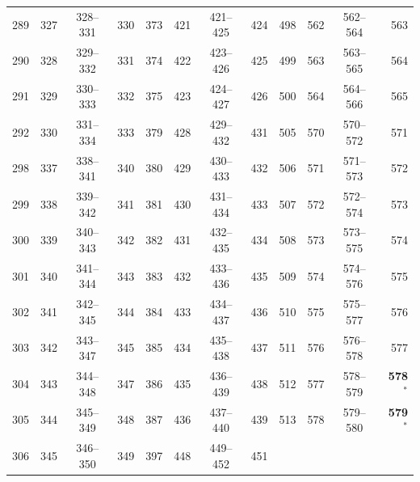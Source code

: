 \begin{longtable}{rrcr|rrcr|rrcr}
289 & 327 & 328--331 & 330 & 373 & 421 & 421--425 & 424 & 498 & 562 & 562--564 & 563 \\
290 & 328 & 329--332 & 331 & 374 & 422 & 423--426 & 425 & 499 & 563 & 563--565 & 564 \\
291 & 329 & 330--333 & 332 & 375 & 423 & 424--427 & 426 & 500 & 564 & 564--566 & 565 \\
292 & 330 & 331--334 & 333 & 379 & 428 & 429--432 & 431 & 505 & 570 & 570--572 & 571 \\
298 & 337 & 338--341 & 340 & 380 & 429 & 430--433 & 432 & 506 & 571 & 571--573 & 572 \\
299 & 338 & 339--342 & 341 & 381 & 430 & 431--434 & 433 & 507 & 572 & 572--574 & 573 \\
300 & 339 & 340--343 & 342 & 382 & 431 & 432--435 & 434 & 508 & 573 & 573--575 & 574 \\
301 & 340 & 341--344 & 343 & 383 & 432 & 433--436 & 435 & 509 & 574 & 574--576 & 575 \\
302 & 341 & 342--345 & 344 & 384 & 433 & 434--437 & 436 & 510 & 575 & 575--577 & 576 \\
303 & 342 & 343--347 & 345 & 385 & 434 & 435--438 & 437 & 511 & 576 & 576--578 & 577 \\
304 & 343 & 344--348 & 347 & 386 & 435 & 436--439 & 438 & 512 & 577 & 578--579 & \textbf{578}$^{*}$ \\
305 & 344 & 345--349 & 348 & 387 & 436 & 437--440 & 439 & 513 & 578 & 579--580 & \textbf{579}$^{*}$ \\
306 & 345 & 346--350 & 349 & 397 & 448 & 449--452 & 451 &  & & &  \\
\bottomrule
\end{longtable}
